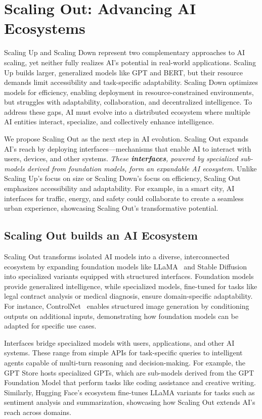 \section{Scaling Out: Advancing  AI Ecosystems} \label{sec:scaling_out}
Scaling Up and Scaling Down represent two complementary approaches to AI scaling, yet neither fully realizes AI’s potential in real-world applications. Scaling Up builds larger, generalized models like GPT and BERT, but their resource demands limit accessibility and task-specific adaptability. Scaling Down optimizes models for efficiency, enabling deployment in resource-constrained environments, but struggles with adaptability, collaboration, and decentralized intelligence. To address these gaps, AI must evolve into a distributed ecosystem where multiple AI entities interact, specialize, and collectively enhance intelligence.

We propose Scaling Out as the next step in AI evolution. Scaling Out expands AI’s reach by deploying interfaces—mechanisms that enable AI to interact with users, devices, and other systems. \emph{These \textbf{interfaces}, powered by specialized sub-models derived from foundation models, form an expandable AI ecosystem}. Unlike Scaling Up’s focus on size or Scaling Down’s focus on efficiency, Scaling Out emphasizes accessibility and adaptability. For example, in a smart city, AI interfaces for traffic, energy, and safety could collaborate to create a seamless urban experience, showcasing Scaling Out’s transformative potential.

\subsection{Scaling Out builds an AI Ecosystem}
Scaling Out transforms isolated AI models into a diverse, interconnected ecosystem by expanding foundation models like LLaMA~\cite{touvron2023llama} and Stable Diffusion~\cite{rombach2022high} into specialized variants equipped with structured interfaces. Foundation models provide generalized intelligence, while specialized models, fine-tuned for tasks like legal contract analysis or medical diagnosis, ensure domain-specific adaptability. For instance, ControlNet~\cite{zhang2023adding} enables structured image generation by conditioning outputs on additional inputs, demonstrating how foundation models can be adapted for specific use cases.

Interfaces bridge specialized models with users, applications, and other AI systems. These range from simple APIs for task-specific queries to intelligent agents capable of multi-turn reasoning and decision-making. For example, the GPT Store hosts specialized GPTs, which are sub-models derived from the GPT Foundation Model that perform tasks like coding assistance and creative writing. Similarly, Hugging Face’s ecosystem fine-tunes LLaMA variants for tasks such as sentiment analysis and summarization, showcasing how Scaling Out extends AI’s reach across domains.

